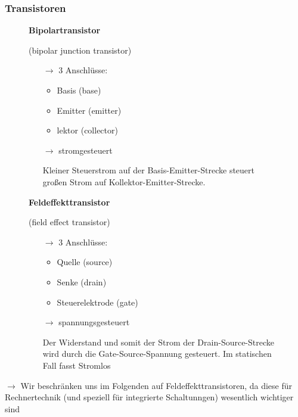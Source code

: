 \documentclass[12pt]{report}
\begin{document}
\subsubsection{Transistoren}
\begin{figure}[H]
  \begin{minipage}{0.45\textwidth}
    \textbf{Bipolartransistor}
    \par (bipolar junction transistor)
    \begin{itemize}
      \item[$\rightarrow$] 3 Anschlüsse:
            \begin{itemize}
              \item Basis (base)
              \item Emitter (emitter)
              \item lektor (collector)
            \end{itemize}
      \item[$\rightarrow$] stromgesteuert
            
            Kleiner Steuerstrom auf der Basis-Emitter-Strecke steuert großen Strom auf Kollektor-Emitter-Strecke.
    \end{itemize}
  \end{minipage}
  \hfill
  \begin{minipage}{0.45\textwidth}
    \textbf{Feldeffekttransistor}
    \par (field effect transistor)
    \begin{itemize}
      \item[$\rightarrow$] 3 Anschlüsse:
            \begin{itemize}
              \item Quelle (source)
              \item Senke (drain)
              \item Steuerelektrode (gate)
            \end{itemize}
      \item[$\rightarrow$] spannungsgesteuert
            
            Der Widerstand und somit der Strom der Drain-Source-Strecke wird durch die Gate-Source-Spannung gesteuert. Im statischen Fall fasst Stromlos
    \end{itemize}
  \end{minipage}
\end{figure}

$\rightarrow$ Wir beschränken uns im Folgenden auf Feldeffekttransistoren, da diese für Rechnertechnik (und speziell für integrierte Schaltunngen) wesentlich wichtiger sind
\end{document}
